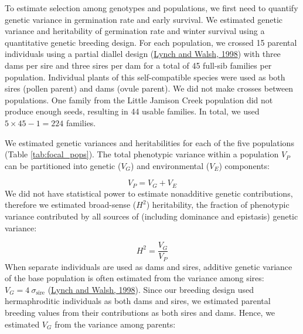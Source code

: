 \documentclass[
  12pt,
]{article}
\begin{document}
To estimate selection among genotypes and populations, we first need to quantify genetic variance in germination rate and early survival. We estimated genetic variance and heritability of germination rate and winter survival using a quantitative genetic breeding design. For each population, we crossed 15 parental individuals using a partial diallel design (\protect\hyperlink{ref-lynch_genetics_1998}{Lynch and Walsh, 1998}) with three dams per sire and three sires per dam for a total of 45 full-sib families per population. Individual plants of this self-compatible species were used as both sires (pollen parent) and dams (ovule parent). We did not make crosses between populations. One family from the Little Jamison Creek population did not produce enough seeds, resulting in 44 usable families. In total, we used \(5 \times 45 - 1 = 224\) families.

We estimated genetic variances and heritabilities for each of the five populations (Table \ref{tab:focal_pops}). The total phenotypic variance within a population \(V_P\) can be partitioned into genetic (\(V_G\)) and environmental (\(V_E\)) components:

\[V_P = V_G + V_E\]
We did not have statistical power to estimate nonadditive genetic contributions, therefore we estimated broad-sense (\(H^2\)) heritability, the fraction of phenotypic variance contributed by all sources of (including dominance and epistasis) genetic variance:

\[H ^ 2 = \frac{V_G}{V_P}\]
When separate individuals are used as dams and sires, additive genetic variance of the base population is often estimated from the variance among sires: \(V_G = 4~\sigma_{\mathrm{sire}}\) (\protect\hyperlink{ref-lynch_genetics_1998}{Lynch and Walsh, 1998}). Since our breeding design used hermaphroditic individuals as both dams and sires, we estimated parental breeding values from their contributions as both sires and dams. Hence, we estimated \(V_G\) from the variance among parents:
\end{document}
